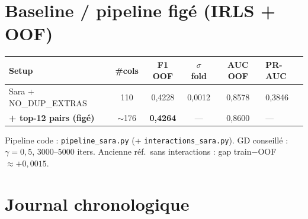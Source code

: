 \documentclass[11pt,a4paper]{article}
\begin{document}
\section{Baseline / pipeline figé (IRLS + OOF)}
\begin{center}
\begin{tabular}{@{}lcccc@{}}
\toprule
Setup & \#cols & F1 OOF & $\sigma$ fold & AUC OOF & PR-AUC \\
\midrule
Sara + NO\_DUP\_EXTRAS & 110 & 0{,}4228 & 0{,}0012 & 0{,}8578 & 0{,}3846 \\
\textbf{+ top-12 pairs (figé)} & $\sim$176 & \textbf{0{,}4264} & --- & 0{,}8600 & --- \\
\bottomrule
\end{tabular}
\end{center}
\noindent Pipeline code : \texttt{pipeline\_sara.py} (+ \texttt{interactions\_sara.py}).
GD conseillé : $\gamma=0{,}5$, $3000$--$5000$ iters.
Ancienne réf.\ sans interactions : gap train$-$OOF $\approx +0{,}0015$.

\section{Journal chronologique}
\end{document}
